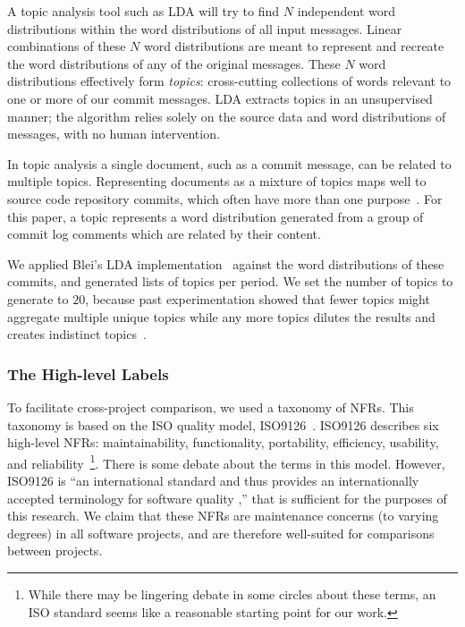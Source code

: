 \documentclass[smallextended]{svjour3}       %
\begin{document}
A topic analysis tool such as LDA will try to find $N$ independent
word distributions within the word distributions of all input messages. 
Linear combinations of these $N$ word distributions are meant to represent and recreate the word distributions of any of the original messages. 
These $N$ word distributions effectively form \emph{topics}: cross-cutting collections of words relevant to one or more of our commit messages. 
LDA extracts topics in an unsupervised manner; the algorithm relies
solely on the source data and word distributions of messages, with no human intervention.

In topic analysis a single document, such as a commit message, can be related to multiple topics. 
Representing documents as a mixture of topics maps well to source code repository commits, which often have more than one purpose~\cite{Hindle09ICSM}.  
For this paper, a topic represents a word distribution generated from a group of commit log comments which are related by their content.  

We applied Blei's LDA implementation~\cite{Blei2003} against the word distributions of these commits, and generated lists of topics per period. 
We set the number of topics to generate to $20$, because past experimentation showed that fewer topics might aggregate multiple unique topics while
any more topics dilutes the results and creates indistinct topics~\cite{Hindle09ICSM}. 

\subsubsection{The High-level Labels}


To facilitate cross-project comparison, we used a taxonomy of NFRs. This taxonomy is based on the ISO quality model, ISO9126~\cite{iso9126}. 
ISO9126 describes six high-level NFRs: maintainability, functionality,
portability, efficiency, usability, and reliability~\footnote{While there may be lingering debate in some circles about these terms, an ISO standard
seems like a reasonable starting point for our work.}.
There is some debate about the terms in this model. 
However, ISO9126 is ``an international standard and thus provides an 
internationally accepted terminology for software quality \cite[p. 58]{Boegh2008},'' that is sufficient for the purposes of this research.  
We claim that these NFRs are maintenance concerns (to varying degrees) in all software projects, and are therefore well-suited for comparisons between
projects.
\end{document}
